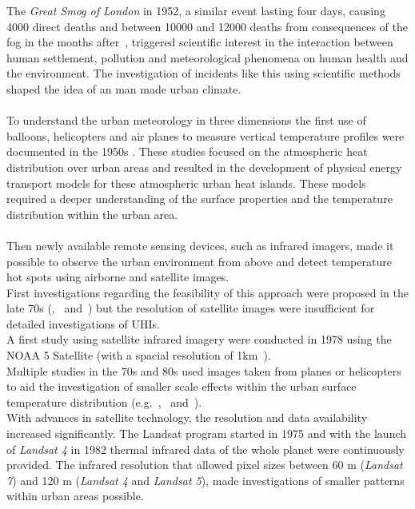 \documentclass[12pt,a4paper, english,twoside]{scrartcl}
\begin{document}
  The \textit{Great Smog of London} in 1952, a similar event lasting four days, causing 4000 direct deaths and between 10000 and 12000 deaths from consequences of the fog in the months after~\autocite{Bell2004}, triggered scientific interest in the interaction between human settlement, pollution and meteorological phenomena on human health and the environment. 
  The investigation of incidents like this using scientific methods shaped the idea of an man made urban climate.\\ \\ 
%
  To understand the urban meteorology in three dimensions the first use of balloons, helicopters and air planes to measure vertical temperature profiles were documented in the 1950s \autocite{Duckworth1954}.
  These studies focused on the atmospheric heat distribution over urban areas and resulted in the development of physical energy transport models for these atmospheric urban heat islands.
  These models required a deeper understanding of the surface properties and the temperature distribution within the urban area.\\ \\
  Then newly available remote sensing devices, such as infrared imagers, made it possible to observe the urban environment from above and detect temperature hot spots using airborne and satellite images.  \\
  First investigations regarding the feasibility of this approach were proposed in the late 70s (\cite{Watson1975},~\cite{Carlson1977} and~\cite{Block1978}) but the resolution of satellite images were insufficient for detailed investigations of \glspl{UHI}.\\
  A first study using satellite infrared imagery were conducted in 1978 using the NOAA 5 Satellite (with a spacial resolution of 1km~\autocite{Matson1978}).\\
  Multiple studies in the 70s and 80s used images taken from planes or helicopters to aid the investigation of smaller scale effects within the urban surface temperature distribution (e.g.~\cite{Landsberg1979},~\cite{ljungberg1980use} and~\cite{Foster1981}). \\
  With advances in satellite technology, the resolution and data availability increased significantly. 
  The Landsat program started in 1975 and with the launch of \textit{Landsat 4} in 1982 thermal infrared data of the whole planet were continuously provided. 
  The infrared resolution that allowed pixel sizes between 60 m (\textit{Landsat 7}) and 120 m (\textit{Landsat 4} and \textit{Landsat 5}), made investigations of smaller patterns within urban areas possible.\\
\end{document}
